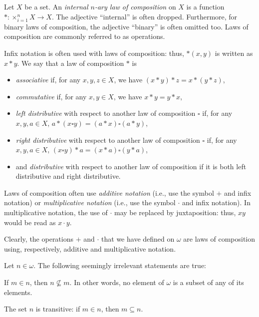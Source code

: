 \begin{definition}
Let $X$ be a set. An \emph{internal $n$-ary law of composition} on $X$ is a function $*:\times_{i=1}^n X \longrightarrow X$. The adjective ``internal'' is often dropped. Furthermore, for binary laws of composition, the adjective ``binary'' is often omitted too.
Laws of composition are commonly referred to as operations.

Infix notation is often used with laws of composition: thus, $*(x,y)$ is written as $x * y$. We say that a law of composition $*$ is
\begin{itemize}
\item \emph{associative} if, for any $x,y,z\in X$, we have $(x*y)*z = x * (y * z)$,
\item \emph{commutative} if, for any $x,y \in X$, we have $x * y = y * x$,
\item \emph{left distributive} with respect to another law of composition $\square$ if, for any $x,y,a\in X$, $a * (x \square y) = (a * x) \square (a * y)$,
\item \emph{right distributive} with respect to another law of composition $\square$ if, for any $x,y,a\in X$, $ (x \square y) * a = (x * a) \square (y * a)$,
\item and \emph{distributive} with respect to another law of composition if it is both left distributive and right distributive.
\end{itemize}
Laws of composition often use \emph{additive notation} (i.e., use the symbol $+$ and infix notation) or \emph{multiplicative notation} (i.e., use the symbol $\cdot$ and infix notation). In multiplicative notation, the use of $\cdot$ may be replaced by juxtaposition: thus, $xy$ would be read as $x\cdot y$.

Clearly, the operations $+$ and $\cdot$ that we have defined on $\omega$ are laws of composition using, respectively, additive and multiplicative notation.
\label{<+label+>}
\end{definition}

\begin{lemma}
Let $n\in \omega$. The following seemingly irrelevant statements are true:
\begin{statements}
\item \label{wsubse} If $m\in n$, then $n\not\subseteq m$. In other words, no element of $\omega$ is a subset of any of its elements.
\item \label{wtrans} The set $n$ is transitive: if $m\in n$, then $m\subseteq n$.
\end{statements}
\label{lemmapeano}
\end{lemma}

